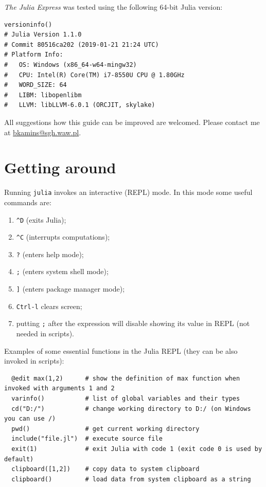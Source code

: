 \documentclass[10pt,a4paper]{article}
\begin{document}
\emph{The Julia Express} was tested using the following 64-bit Julia version:
\begin{lstlisting}
versioninfo()
# Julia Version 1.1.0
# Commit 80516ca202 (2019-01-21 21:24 UTC)
# Platform Info:
#   OS: Windows (x86_64-w64-mingw32)
#   CPU: Intel(R) Core(TM) i7-8550U CPU @ 1.80GHz
#   WORD_SIZE: 64
#   LIBM: libopenlibm
#   LLVM: libLLVM-6.0.1 (ORCJIT, skylake)
\end{lstlisting}

All suggestions how this guide can be improved are welcomed. Please contact me at \href{mailto:bkamins@sgh.waw.pl}{bkamins@sgh.waw.pl}.

\section{Getting around}

Running \lstinline|julia| invokes an interactive (REPL) mode. In this mode some useful commands are:
\begin{enumerate}[label=\arabic*),nolistsep]
  \item \lstinline|^D| (exits Julia);
  \item \lstinline|^C| (interrupts computations);
  \item \lstinline|?| (enters help mode);
  \item \lstinline|;| (enters system shell mode);
  \item \lstinline|]| (enters package manager mode);
  \item \lstinline|Ctrl-l| clears screen;
  \item putting \lstinline|;| after the expression will disable showing its value in REPL (not needed in scripts).
\end{enumerate}

Examples of some essential functions in the Julia REPL (they can be also invoked in scripts):
\begin{lstlisting}
  @edit max(1,2)      # show the definition of max function when invoked with arguments 1 and 2
  varinfo()           # list of global variables and their types
  cd("D:/")           # change working directory to D:/ (on Windows you can use /)
  pwd()               # get current working directory
  include("file.jl")  # execute source file
  exit(1)             # exit Julia with code 1 (exit code 0 is used by default)
  clipboard([1,2])    # copy data to system clipboard
  clipboard()         # load data from system clipboard as a string
\end{lstlisting}
\end{document}
